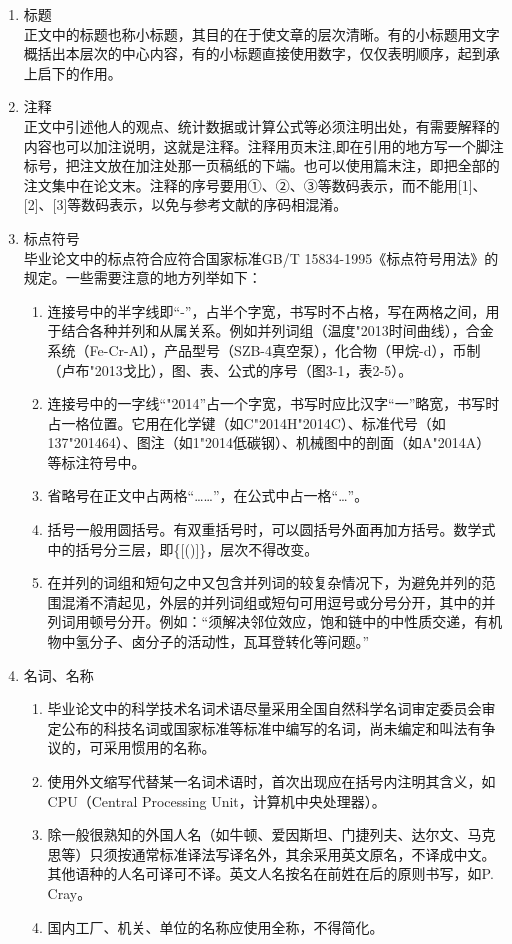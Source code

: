 \documentclass{HDU-Bachelor-Thesis}
\begin{document}
\begin{enumerate}

    \item 标题\\
    正文中的标题也称小标题，其目的在于使文章的层次清晰。有的小标题用文字概括出本层次的中心内容，有的小标题直接使用数字，仅仅表明顺序，起到承上启下的作用。

    \item 注释\\
    正文中引述他人的观点、统计数据或计算公式等必须注明出处，有需要解释的内容也可以加注说明，这就是注释。注释用页末注,即在引用的地方写一个脚注标号，把注文放在加注处那一页稿纸的下端。也可以使用篇末注，即把全部的注文集中在论文末。注释的序号要用①、②、③等数码表示，而不能用[1]、[2]、[3]等数码表示，以免与参考文献的序码相混淆。

    \item 标点符号\\
    毕业论文中的标点符合应符合国家标准GB/T 15834-1995《标点符号用法》\cite{gbt15834-1995}的规定。一些需要注意的地方列举如下：
    \begin{enumerate}
        \item 连接号中的半字线即“-”，占半个字宽，书写时不占格，写在两格之间，用于结合各种并列和从属关系。例如并列词组（温度\char"2013{}时间曲线），合金系统（Fe-Cr-Al），产品型号（SZB-4真空泵），化合物（甲烷-d），币制（卢布\char"2013{}戈比），图、表、公式的序号（图3-1，表2-5）。
        \item 连接号中的一字线“\char"2014{}”占一个字宽，书写时应比汉字“一”略宽，书写时占一格位置。它用在化学键（如C\char"2014{}H\char"2014{}C）、标准代号（如137\char"2014{}64）、图注（如1\char"2014{}低碳钢）、机械图中的剖面（如A\char"2014{}A）等标注符号中。
        \item 省略号在正文中占两格“……”，在公式中占一格“…”。
        \item 括号一般用圆括号。有双重括号时，可以圆括号外面再加方括号。数学式中的括号分三层，即\{[()]\}，层次不得改变。
        \item 在并列的词组和短句之中又包含并列词的较复杂情况下，为避免并列的范围混淆不清起见，外层的并列词组或短句可用逗号或分号分开，其中的并列词用顿号分开。例如：“须解决邻位效应，饱和链中的中性质交递，有机物中氢分子、卤分子的活动性，瓦耳登转化等问题。”
    \end{enumerate}

    \item 名词、名称
    \begin{enumerate}
        \item 毕业论文中的科学技术名词术语尽量采用全国自然科学名词审定委员会审定公布的科技名词或国家标准等标准中编写的名词，尚未编定和叫法有争议的，可采用惯用的名称。
        \item 使用外文缩写代替某一名词术语时，首次出现应在括号内注明其含义，如CPU（Central Processing Unit，计算机中央处理器）。
        \item 除一般很熟知的外国人名（如牛顿、爱因斯坦、门捷列夫、达尔文、马克思等）只须按通常标准译法写译名外，其余采用英文原名，不译成中文。其他语种的人名可译可不译。英文人名按名在前姓在后的原则书写，如P. Cray。
        \item 国内工厂、机关、单位的名称应使用全称，不得简化。
    \end{enumerate}


\end{enumerate}
\end{document}
